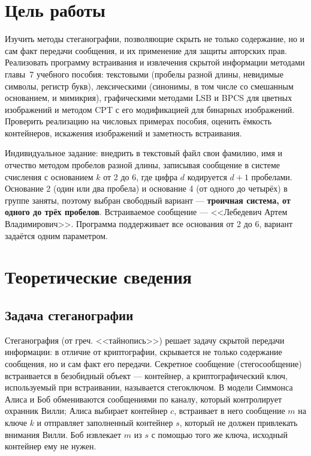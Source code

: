 \documentclass[14pt,a4paper]{extarticle}
\begin{document}

\tableofcontents

\section{Цель работы}

Изучить методы стеганографии, позволяющие скрыть не только содержание, но и сам факт
передачи сообщения, и их применение для защиты авторских прав. Реализовать программу
встраивания и извлечения скрытой информации методами главы~7 учебного пособия:
текстовыми (пробелы разной длины, невидимые символы, регистр букв), лексическими
(синонимы, в том числе со смешанным основанием, и мимикрия), графическими методами LSB
и BPCS для цветных изображений и методом CPT с его модификацией для бинарных
изображений. Проверить реализацию на числовых примерах пособия, оценить ёмкость
контейнеров, искажения изображений и заметность встраивания.

Индивидуальное задание: внедрить в текстовый файл свои фамилию, имя и отчество
методом пробелов разной длины, записывая сообщение в системе счисления с основанием
$k$ от 2 до 6, где цифра $d$ кодируется $d + 1$ пробелами. Основание 2 (один или два
пробела) и основание 4 (от одного до четырёх) в группе заняты, поэтому выбран
свободный вариант --- \textbf{троичная система, от одного до трёх пробелов}. Встраиваемое
сообщение --- <<Лебедевич Артем Владимирович>>. Программа поддерживает все основания
от 2 до 6, вариант задаётся одним параметром.

\section{Теоретические сведения}

\subsection{Задача стеганографии}

Стеганография (от греч. <<тайнопись>>) решает задачу скрытой передачи информации: в
отличие от криптографии, скрывается не только содержание сообщения, но и сам факт его
передачи. Секретное сообщение (стегосообщение) встраивается в безобидный объект ---
контейнер, а криптографический ключ, используемый при встраивании, называется
стегоключом. В модели Симмонса Алиса и Боб обмениваются сообщениями по каналу, который
контролирует охранник Вилли; Алиса выбирает контейнер $c$, встраивает в него сообщение
$m$ на ключе $k$ и отправляет заполненный контейнер $s$, который не должен привлекать
внимания Вилли. Боб извлекает $m$ из $s$ с помощью того же ключа, исходный контейнер
ему не нужен.
\end{document}

